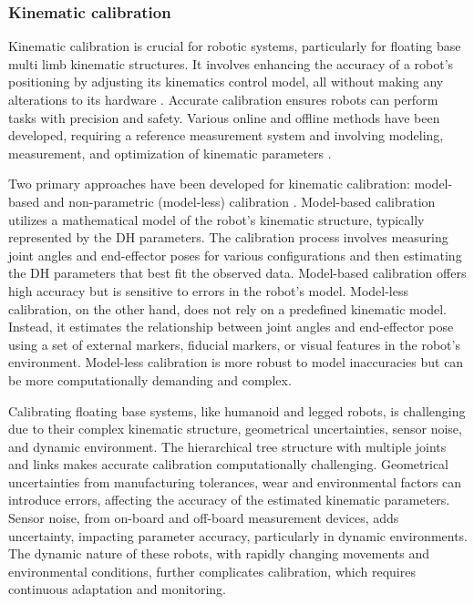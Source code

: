 \subsubsection{Kinematic calibration}
Kinematic calibration is crucial for robotic systems, particularly for floating base multi limb kinematic structures. It involves enhancing the accuracy of a robot's positioning by adjusting its kinematics control model, all without making any alterations to its hardware \cite{ChenGang2014Reviewkinematicscalibration}. Accurate calibration ensures robots can perform tasks with precision and safety. Various online and offline methods have been developed, requiring a reference measurement system and involving modeling, measurement, and optimization of kinematic parameters \cite{Petrivc2023Kinematicmodelcalibration}.

Two primary approaches have been developed for kinematic calibration: model-based and non-parametric (model-less) calibration \cite{ChenGang2014Reviewkinematicscalibration}. Model-based calibration utilizes a mathematical model of the robot's kinematic structure, typically represented by the DH parameters. The calibration process involves measuring joint angles and end-effector poses for various configurations and then estimating the DH parameters that best fit the observed data. Model-based calibration offers high accuracy but is sensitive to errors in the robot's model. Model-less calibration, on the other hand, does not rely on a predefined kinematic model. Instead, it estimates the relationship between joint angles and end-effector pose using a set of external markers, fiducial markers, or visual features in the robot's environment. Model-less calibration is more robust to model inaccuracies but can be more computationally demanding and complex.

Calibrating floating base systems, like humanoid and legged robots, is challenging due to their complex kinematic structure, geometrical uncertainties, sensor noise, and dynamic environment. The hierarchical tree structure with multiple joints and links makes accurate calibration computationally challenging. Geometrical uncertainties from manufacturing tolerances, wear and environmental factors can introduce errors, affecting the accuracy of the estimated kinematic parameters. Sensor noise, from on-board and off-board measurement devices, adds uncertainty, impacting parameter accuracy, particularly in dynamic environments. The dynamic nature of these robots, with rapidly changing movements and environmental conditions, further complicates calibration, which requires continuous adaptation and monitoring.

